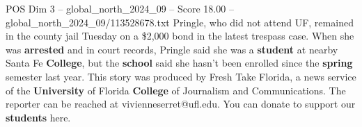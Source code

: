 \begin{textsample}{POS Dim 3 – global\_north\_2024\_09 – Score 18.00 – global\_north\_2024\_09/113528678.txt}
Pringle, who did not attend UF, remained in the county jail Tuesday on a \$2,000 bond in the latest trespass case.
When she was \textbf{arrested} and in court records, Pringle said she was a \textbf{student} at nearby Santa Fe \textbf{College}, but the \textbf{school} said she hasn't been enrolled since the \textbf{spring} semester last year.
This story was produced by Fresh Take Florida, a news service of the \textbf{University} of Florida \textbf{College} of Journalism and Communications.
The reporter can be reached at vivienneserret@ufl.edu.
You can donate to support our \textbf{students} here.

\end{textsample}
